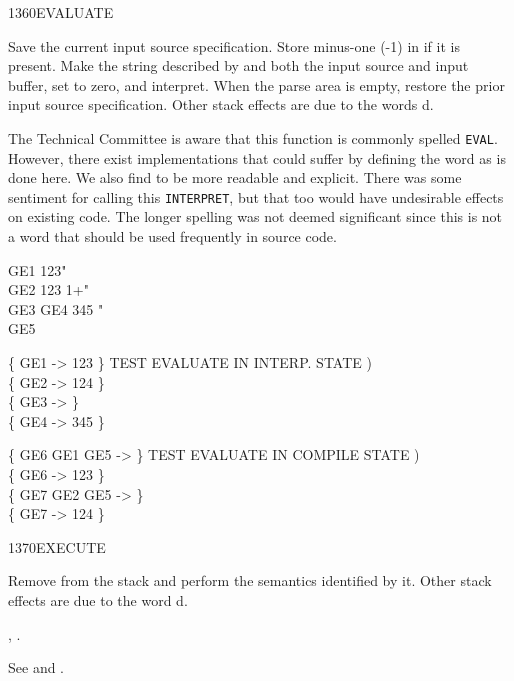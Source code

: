 \begin{worddef}{1360}{EVALUATE}
\item {}

	Save the current input source specification. Store minus-one
	(-1) in  if it is present. Make the string
	described by  and  both the input source
	and input buffer, set  to zero, and interpret. When
	the parse area is empty, restore the prior input source
	specification. Other stack effects are due to the words
	d.

	\begin{defer}
	\rationale %
		The Technical Committee is aware that this function is
		commonly spelled \texttt{EVAL}. However, there exist
		implementations that could suffer by defining the word as is
		done here. We also find  to be more readable
		and explicit. There was some sentiment for calling this
		\texttt{INTERPRET}, but that too would have undesirable
		effects on existing code. The longer spelling was not deemed
		significant since this is not a word that should be used
		frequently in source code.

	\testing
		\word{:} GE1  123" \word{;}  \\
		\word{:} GE2  123 1+" \word{;}  \\
		\word{:} GE3  \word{:} GE4 345 \word{;}" \word{;} \\
		\word{:} GE5  \word{;} 

		\{ GE1  -> 123 \} \tab[3]  TEST EVALUATE IN INTERP. STATE ) \\
		\{ GE2  -> 124 \} \\
		\{ GE3  ->     \} \\
		\{ GE4                 -> 345 \}

		\{ \word{:} GE6 GE1 GE5 \word{;} -> \} \tab[3.4]  TEST EVALUATE IN COMPILE STATE ) \\
		\{ GE6 -> 123 \} \\
		\{ \word{:} GE7 GE2 GE5 \word{;} -> \} \\
		\{ GE7 -> 124 \} \\
	\end{defer}
\end{worddef}


\begin{worddef}{1370}{EXECUTE}
\item {}

	Remove  from the stack and perform the semantics
	identified by it. Other stack effects are due to the word
	d.

\see {},
	\wref{core:[']}{[']}.

	\begin{defer}
	\testing
		\rmfamily
		See  and \rref{core:[']}{[']}.
	\end{defer}
\end{worddef}


